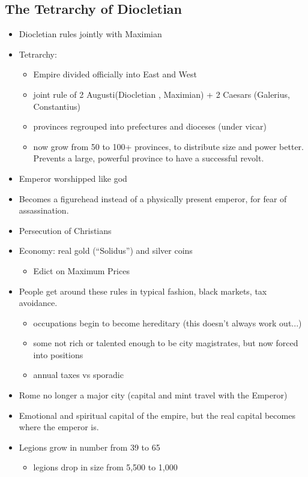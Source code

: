 \documentclass[12pt, twoside]{article}
\begin{document}
\subsection{The Tetrarchy of Diocletian}
\begin{itemize}
\item Diocletian rules jointly with Maximian
\item Tetrarchy:
	\begin{itemize}
	\item Empire divided officially into East and West
	\item joint rule of 2 Augusti(Diocletian , Maximian) + 2 Caesars (Galerius, Constantius)
	\item provinces regrouped into prefectures and dioceses (under vicar)
	\item now grow from 50 to 100+ provinces, to distribute size and power better.  Prevents a large, powerful province to have a successful revolt.
	\end{itemize}
\item Emperor worshipped like god
\item Becomes a figurehead instead of a physically present emperor, for fear of assassination.
\item Persecution of Christians
\item Economy: real gold (“Solidus”) and silver coins
	\begin{itemize}
	\item Edict on Maximum Prices
	\end{itemize}
\item People get around these rules in typical fashion, black markets, tax avoidance.
	\begin{itemize}
	\item occupations begin to become hereditary (this doesn't always work out...)
	\item some not rich or talented enough to be city magistrates, but now forced into positions
	\item annual taxes vs sporadic
	\end{itemize}
\item Rome no longer a major city (capital and mint travel with the Emperor)
\item Emotional and spiritual capital of the empire, but the real capital becomes where the emperor is.
\item Legions grow in number from 39 to 65
	\begin{itemize}
	\item legions drop in size from 5,500 to 1,000

\end{itemize}
\end{itemize}
\end{document}
